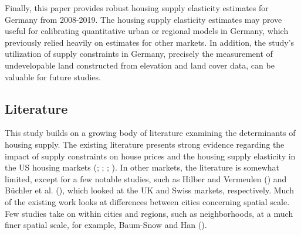 \documentclass[
  12pt,
]{article}
\begin{document}
Finally, this paper provides robust housing supply elasticity estimates for Germany from 2008-2019. The housing supply elasticity estimates may prove useful for calibrating quantitative urban or regional models in Germany, which previously relied heavily on estimates for other markets. In addition, the study's utilization of supply constraints in Germany, precisely the measurement of undevelopable land constructed from elevation and land cover data, can be valuable for future studies.

\subsection{Literature}\label{literature}

This study builds on a growing body of literature examining the determinants of housing supply. The existing literature presents strong evidence regarding the impact of supply constraints on house prices and the housing supply elasticity in the US housing markets (; ; ; ). In other markets, the literature is somewhat limited, except for a few notable studies, such as Hilber and Vermeulen () and Büchler et al. (), which looked at the UK and Swiss markets, respectively. Much of the existing work looks at differences between cities concerning spatial scale. Few studies take on within cities and regions, such as neighborhoods, at a much finer spatial scale, for example, Baum-Snow and Han ().
\end{document}
